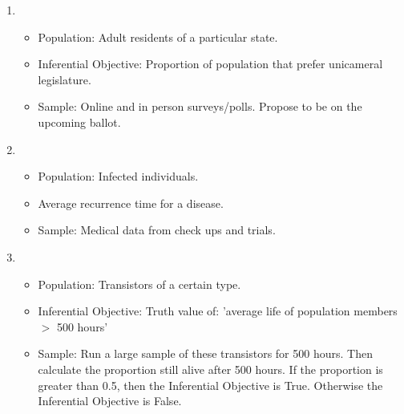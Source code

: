 \documentclass[12pt]{article}
\begin{document}
\begin{enumerate}[label=(\alph*).]
        \item 
        \begin{itemize}
            \item Population: Adult residents of a particular state.
            \item Inferential Objective: Proportion of population that prefer unicameral legislature.
            \item Sample: Online and in person surveys/polls. Propose to be on the upcoming ballot.
        \end{itemize}
        
        \item 
        \begin{itemize}
            \item Population: Infected individuals.
            \item Average recurrence time for a disease.
            \item Sample: Medical data from check ups and trials. 
        \end{itemize}
        
        \item 
        \begin{itemize}
            \item Population: Transistors of a certain type.
            \item Inferential Objective: Truth value of: 'average life of population members $>$ 500 hours'
            \item Sample: Run a large sample of these transistors for 500 hours. Then calculate the proportion still alive after 500 hours. If the proportion is greater than 0.5, then the Inferential Objective is True. Otherwise the Inferential Objective is False.
        \end{itemize}
        
        
        
    \end{enumerate}
\end{document}
